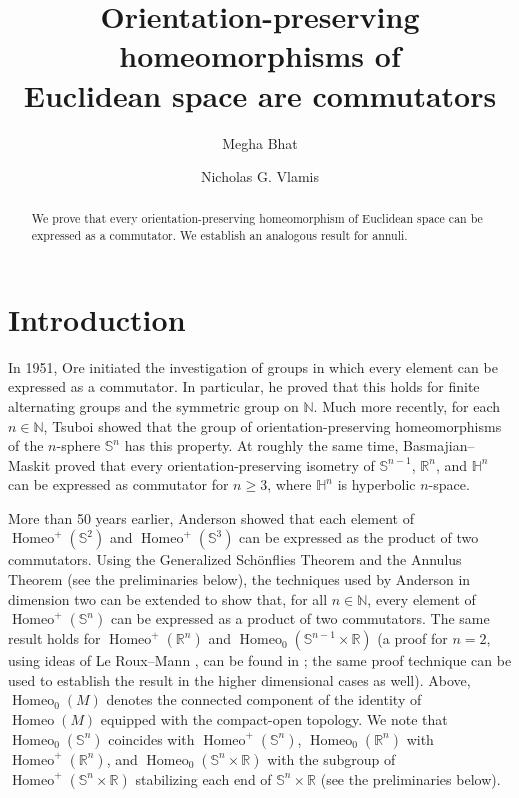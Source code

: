 \documentclass[microtype]{gtpart}
\title{Orientation-preserving homeomorphisms of\\Euclidean space are commutators}%
\author{Megha Bhat}
\author{Nicholas G. Vlamis}
\newcommand{\br}{\mathbb{R}}
\newcommand{\bn}{\mathbb N}
\DeclareMathOperator{\Homeo}{Homeo}
\theoremstyle{definition}
\numberwithin{equation}{section}
\begin{document}
  

\begin{abstract}
We prove that every orientation-preserving homeomorphism of Euclidean space can be expressed as a commutator.  
We establish an analogous result for annuli. 
\end{abstract}


\maketitle

\vspace{-0.5in}


\section{Introduction}

In 1951, Ore \cite{OreSome} initiated the investigation of groups in which every element can be expressed as a commutator.
In particular, he proved that this holds for finite alternating groups and the symmetric group on \( \bn \).
Much more recently, for each \( n \in \bn \), Tsuboi \cite{TsuboiHomeomorphism} showed that the group of orientation-preserving homeomorphisms of the \( n \)-sphere \( \mathbb S^n \) has this property.
At roughly the same time, Basmajian--Maskit \cite{BasmajianSpace} proved that every orientation-preserving isometry of \( \mathbb S^{n-1} \), \( \br^n \), and \( \mathbb H^n \) can be expressed as commutator for \( n \geq 3 \), where \( \mathbb H^n \) is hyperbolic \( n \)-space.

More than 50 years earlier, Anderson \cite{AndersonAlgebraic} showed that each element of \( \Homeo^+(\mathbb S^2) \) and \( \Homeo^+(\mathbb S^3) \) can be expressed as the product of two commutators. %
Using the Generalized Sch\"onflies Theorem and the Annulus Theorem (see the preliminaries below), the techniques used by Anderson in dimension two can be extended to show that, for all \( n \in \bn \), every element of \( \Homeo^+(\mathbb S^n) \) can be expressed as a product of two commutators. 
The same result holds for \( \Homeo^+(\br^n) \) and \( \Homeo_0(\mathbb S^{n-1} \times \br) \) (a proof for \( n = 2 \), using ideas of Le Roux--Mann \cite{LeRouxStrong}, can be found in \cite{VlamisHomeomorphism}; the same proof technique can be used to establish the result in the higher dimensional cases as well). 
Above, \( \Homeo_0(M) \) denotes the connected component of the identity of \( \Homeo(M) \) equipped with the compact-open topology.
We note that \( \Homeo_0(\mathbb S^n) \) coincides with \( \Homeo^+(\mathbb S^n) \),  \( \Homeo_0(\br^n) \)  with  \( \Homeo^+(\br^n) \), and \( \Homeo_0(\mathbb S^n \times \br) \) with the subgroup of \( \Homeo^+(\mathbb S^n \times \br) \) stabilizing each end of \( \mathbb S^n \times \br \) (see the preliminaries below). 
\end{document}
